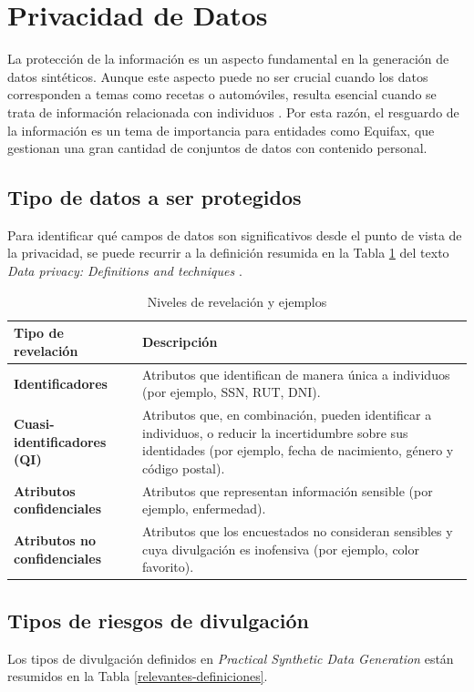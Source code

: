 \newpage
\section{Privacidad de Datos}
La protección de la información es un aspecto fundamental en la generación de datos sintéticos. Aunque este aspecto puede no ser crucial cuando los datos corresponden a temas como recetas o automóviles, resulta esencial cuando se trata de información relacionada con individuos \cite{bruce_practical_2020}. Por esta razón, el resguardo de la información es un tema de importancia para entidades como Equifax, que gestionan una gran cantidad de conjuntos de datos con contenido personal.

\subsection{Tipo de datos a ser protegidos}
Para identificar qué campos de datos son significativos desde el punto de vista de la privacidad, se puede recurrir a la definición resumida en la Tabla \ref{data-relevante} del texto \emph{Data privacy: Definitions and techniques} \cite{de_capitani_di_vimercati_data_2012}.

\begin{table}[H]
	\centering
	\caption{Niveles de revelación y ejemplos}
	\label{data-relevante}
    \begin{tabular}{|m{15em}|m{20em}|}
    \hline
    \rowcolor[gray]{0.8}
    Tipo de revelación & Descripción \\
    \hline
    \textbf{Identificadores} 
    & Atributos que identifican de manera única a individuos (por ejemplo, SSN, RUT, DNI). \\
    \hline
    \textbf{Cuasi-identificadores (QI)} 
    & Atributos que, en combinación, pueden identificar a individuos, o reducir la incertidumbre sobre sus identidades (por ejemplo, fecha de nacimiento, género y código postal). \\
    \hline
    \textbf{Atributos confidenciales} 
    & Atributos que representan información sensible (por ejemplo, enfermedad). \\
    \hline
    \textbf{Atributos no confidenciales} 
    & Atributos que los encuestados no consideran sensibles y cuya divulgación es inofensiva (por ejemplo, color favorito). \\
    \hline
    \end{tabular}
\end{table}

\newpage
\subsection{Tipos de riesgos de divulgación}
Los tipos de divulgación definidos en \emph{Practical Synthetic Data Generation} \cite{bruce_practical_2020} están resumidos en la Tabla \ref{relevantes-definiciones}.

